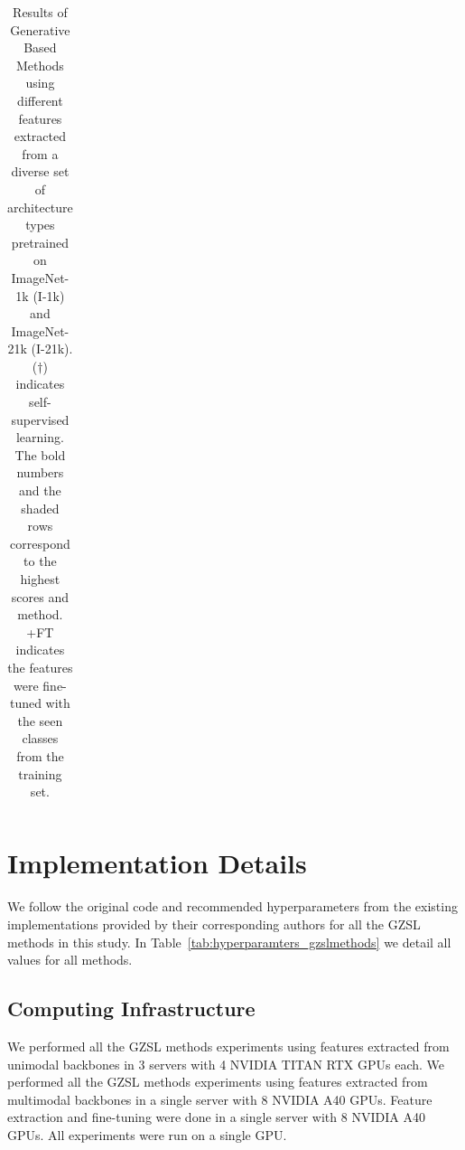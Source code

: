 \begin{table}[h!]
{\begin{tabularx}{\textwidth}{l c l c l c YYY c YYY}
\bottomrule
\end{tabularx}

}

\caption{Results of Generative Based Methods using different features extracted from a diverse set of architecture types pretrained on ImageNet-1k (I-1k) and ImageNet-21k (I-21k). (${\dag}$) indicates self-supervised learning. The bold numbers and the shaded rows correspond to the highest scores and method. +FT indicates the features were fine-tuned with the seen classes from the training set. }
\label{tab:subset_disentanglement_based}
\vspace{-0.1in}
\end{table}




\section{Implementation Details}
\label{sec:implementation_details}

We follow the original code and recommended hyperparameters from the existing implementations provided by their corresponding authors for all the GZSL methods in this study. In Table~\ref{tab:hyperparamters_gzslmethods} we detail all values for all methods.

\subsection{Computing Infrastructure}

We performed all the GZSL methods experiments using features extracted from unimodal backbones in 3 servers with 4 NVIDIA TITAN RTX GPUs each. 
We performed all the GZSL methods experiments using features extracted from multimodal backbones in a single server with 8 NVIDIA A40 GPUs. 
Feature extraction and fine-tuning were done in a single server with 8 NVIDIA A40 GPUs.
All experiments were run on a single GPU.


